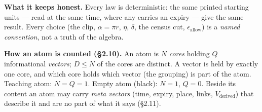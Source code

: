 \documentclass[10.5pt]{article}
\begin{document}
\begin{center}
{{\medskip
\textbf{What it keeps honest.} Every law is deterministic: the same printed starting units — read at the same time, where any carries an expiry — give the same result. Every choice (the clip, $\alpha=\pi r$, $\eta$, $\delta$, the census cut, $\epsilon_{\text{allow}}$) is a \emph{named convention}, not a truth of the algebra.

\medskip
\textbf{How an atom is counted (§2.10).} An atom is $N$ \emph{cores} holding $Q$ informational \emph{vectors}; $D\le N$ of the cores are distinct. A vector is held by exactly one core, and which core holds which vector (the grouping) is part of the atom. Teaching atom: $N=Q=1$. Empty atom (black): $N=1$, $Q=0$. Beside its content an atom may carry \emph{meta vectors} (time, expiry, place, links, $V_{\text{derived}}$) that describe it and are no part of what it says (§2.11).}}\end{center}
\end{document}
